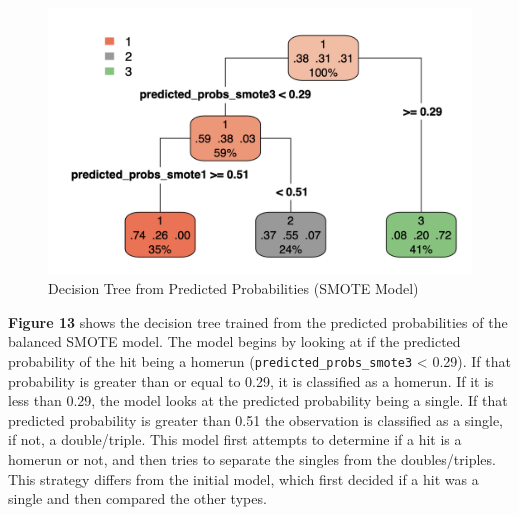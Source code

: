 \documentclass[
  letterpaper,
  DIV=11,
  numbers=noendperiod]{scrartcl}
\begin{document}
\begin{figure}[H]

{\centering \includegraphics{./images/figures/fig13.png}

}

\caption{Decision Tree from Predicted Probabilities (SMOTE Model)}

\end{figure}%

\textbf{Figure 13} shows the decision tree trained from the predicted
probabilities of the balanced SMOTE model. The model begins by looking
at if the predicted probability of the hit being a homerun
(\texttt{predicted\_probs\_smote3} \textless{} 0.29). If that
probability is greater than or equal to 0.29, it is classified as a
homerun. If it is less than 0.29, the model looks at the predicted
probability being a single. If that predicted probability is greater
than 0.51 the observation is classified as a single, if not, a
double/triple. This model first attempts to determine if a hit is a
homerun or not, and then tries to separate the singles from the
doubles/triples. This strategy differs from the initial model, which
first decided if a hit was a single and then compared the other types.
\end{document}
